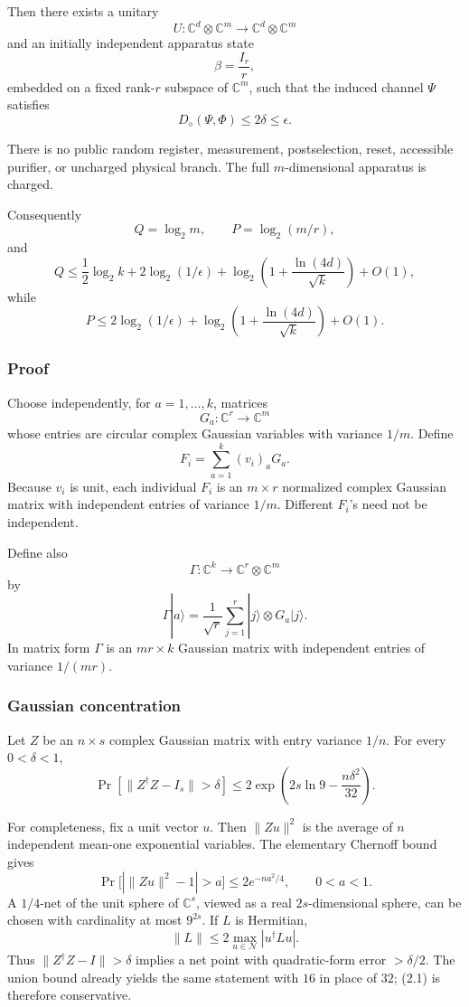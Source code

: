 \documentclass[11pt,a4paper]{article}
\numberwithin{equation}{section}
\begin{document}
Then there exists a unitary \[
U:\mathbb C^d\otimes\mathbb C^m
\longrightarrow
\mathbb C^d\otimes\mathbb C^m
\] and an initially independent apparatus state \[
\beta=\frac{I_r}{r},
\] embedded on a fixed rank-\(r\) subspace of \(\mathbb C^m\), such that
the induced channel \(\Psi\) satisfies \[
D_\diamond(\Psi,\Phi)\le2\delta\le\epsilon.
\]

There is no public random register, measurement, postselection, reset,
accessible purifier, or uncharged physical branch. The full
\(m\)-dimensional apparatus is charged.

Consequently \[
Q=\log_2m,\qquad
P=\log_2(m/r),
\] and \[
Q\le
\frac12\log_2k
+2\log_2(1/\epsilon)
+\log_2\!\left(
1+\frac{\ln(4d)}{\sqrt{k}}
\right)
+O(1),
\] while \[
P\le
2\log_2(1/\epsilon)
+\log_2\!\left(
1+\frac{\ln(4d)}{\sqrt{k}}
\right)
+O(1).
\]

\subsubsection{Proof}\label{proof}

Choose independently, for \(a=1,\ldots,k\), matrices \[
G_a:\mathbb C^r\to\mathbb C^m
\] whose entries are circular complex Gaussian variables with variance
\(1/m\). Define \[
F_i=\sum_{a=1}^k(v_i)_aG_a.
\] Because \(v_i\) is unit, each individual \(F_i\) is an \(m\times r\)
normalized complex Gaussian matrix with independent entries of variance
\(1/m\). Different \(F_i\)'s need not be independent.

Define also \[
\Gamma:\mathbb C^k\to\mathbb C^r\otimes\mathbb C^m
\] by \[
\Gamma|a\rangle
=
\frac1{\sqrt r}
\sum_{j=1}^r
|j\rangle\otimes G_a|j\rangle.
\] In matrix form \(\Gamma\) is an \(mr\times k\) Gaussian matrix with
independent entries of variance \(1/(mr)\).

\subsubsection{Gaussian concentration}\label{gaussian-concentration}

Let \(Z\) be an \(n\times s\) complex Gaussian matrix with entry
variance \(1/n\). For every \(0<\delta<1\), \[
\Pr\!\left[\|Z^\dagger Z-I_s\|>\delta\right]
\le
2\exp\!\left(2s\ln9-\frac{n\delta^2}{32}\right).
\tag{2.1}
\]

For completeness, fix a unit vector \(u\). Then \(\|Zu\|^2\) is the
average of \(n\) independent mean-one exponential variables. The
elementary Chernoff bound gives \[
\Pr\bigl[|\|Zu\|^2-1|>a\bigr]
\le2e^{-na^2/4},
\qquad0<a<1.
\] A \(1/4\)-net of the unit sphere of \(\mathbb C^s\), viewed as a real
\(2s\)-dimensional sphere, can be chosen with cardinality at most
\(9^{2s}\). If \(L\) is Hermitian, \[
\|L\|\le2\max_{u\in\mathcal N}|u^\dagger Lu|.
\] Thus \(\|Z^\dagger Z-I\|>\delta\) implies a net point with
quadratic-form error \(>\delta/2\). The union bound already yields the
same statement with \(16\) in place of \(32\); (2.1) is therefore
conservative.
\end{document}
